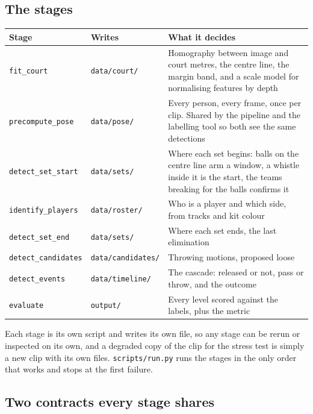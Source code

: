 \documentclass[10pt,a4paper]{article}
\begin{document}
\subsection{The stages}

{\footnotesize
\begin{xltabular}{\textwidth}{L{30mm} L{34mm} X}
\toprule
\textbf{Stage} & \textbf{Writes} & \textbf{What it decides}\\
\midrule
\texttt{fit\_court} & \texttt{data/court/} & Homography between image and court metres, the centre line, the margin band, and a scale model for normalising features by depth\\
\texttt{precompute\_pose} & \texttt{data/pose/} & Every person, every frame, once per clip. Shared by the pipeline and the labelling tool so both see the same detections\\
\texttt{detect\_set\_start} & \texttt{data/sets/} & Where each set begins: balls on the centre line arm a window, a whistle inside it is the start, the teams breaking for the balls confirms it\\
\texttt{identify\_players} & \texttt{data/roster/} & Who is a player and which side, from tracks and kit colour\\
\texttt{detect\_set\_end} & \texttt{data/sets/} & Where each set ends, the last elimination\\
\texttt{detect\_candidates} & \texttt{data/candidates/} & Throwing motions, proposed loose\\
\texttt{detect\_events} & \texttt{data/timeline/} & The cascade: released or not, pass or throw, and the outcome\\
\texttt{evaluate} & \texttt{output/} & Every level scored against the labels, plus the metric\\
\bottomrule
\end{xltabular}}

Each stage is its own script and writes its own file, so any stage can be rerun or
inspected on its own, and a degraded copy of the clip for the stress test is simply a new
clip with its own files. \texttt{scripts/run.py} runs the stages in
the only order that works and stops at the first failure.

\subsection{Two contracts every stage shares}
\end{document}
